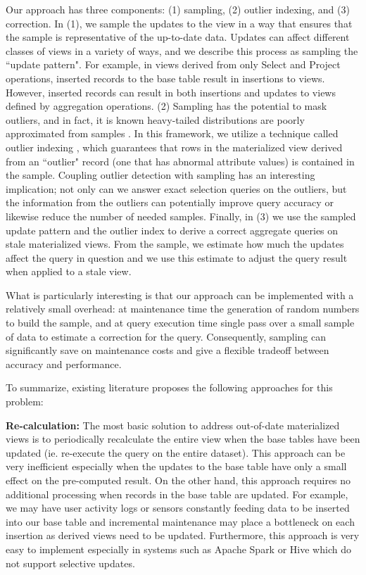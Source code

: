 Our approach has three components: (1) sampling, (2) outlier indexing, and (3) correction. In (1), we sample the updates to the view in a way that ensures that the sample is representative of the up-to-date data. Updates can affect different classes of views in a variety of ways, and we describe this process as sampling the ``update pattern". For example, in views derived from only Select and Project operations, inserted records to the base table result in insertions to views. However, inserted records can result in both insertions and updates to views defined by aggregation operations. (2) Sampling has the potential to mask outliers, and in fact, it is known
heavy-tailed distributions are poorly approximated from samples \cite{chaudhuri2001overcoming}.
In this framework, we utilize a technique called outlier indexing \cite{chaudhuri2001overcoming}, which guarantees that rows in the materialized view derived from an ``outlier" record (one that has abnormal attribute values) is contained in the sample.
Coupling outlier detection with sampling has an interesting implication; not only can we answer exact selection queries on the outliers, but
the information from the outliers can potentially improve query accuracy or likewise reduce the number of needed samples.
Finally, in (3) we use the sampled update pattern and the outlier index to derive a correct aggregate queries on stale materialized views.
From the sample, we estimate how much the updates affect the query in question and we use this estimate to adjust the query result when applied to a stale view.

What is particularly interesting is that our approach can be implemented with a relatively small overhead: at maintenance time the generation of random numbers to build the sample, and at query execution time single pass over a small sample of data to estimate a correction for the query.
Consequently, sampling can significantly save on maintenance costs and give a flexible tradeoff between accuracy and performance.

To summarize, existing literature proposes the following approaches for this problem: 
\vspace{1em}

\noindent\textbf{Re-calculation: }
The most basic solution to address out-of-date materialized views is to periodically 
recalculate the entire view when the base tables have been updated (ie. re-execute the query on the entire dataset).
This approach can be very inefficient especially when the updates to the base table have only a small effect on the pre-computed result.
On the other hand, this approach requires no additional processing when records in the base table are updated.
For example, we may have user activity logs or sensors constantly feeding data to be inserted into our base table and incremental maintenance 
may place a bottleneck on each insertion as derived views need to be updated.
Furthermore, this approach is very easy to implement especially in systems such as Apache Spark or Hive which do not support
selective updates. 

